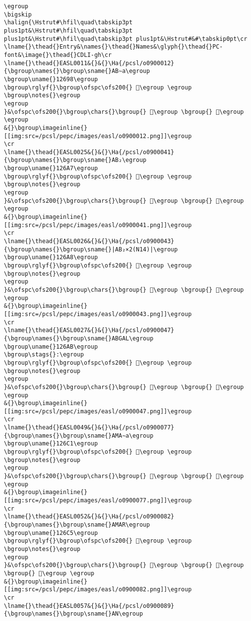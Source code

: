 \begin{verbatim}
\egroup
\bigskip
\halign{\Hstrut#\hfil\quad\tabskip3pt plus1pt&\Hstrut#\hfil\quad\tabskip3pt plus1pt&\Hstrut#\hfil\quad\tabskip3pt plus1pt&\Hstrut#&#\tabskip0pt\cr
\lname{}\thead{}Entry&\names{}\thead{}Names&\glyph{}\thead{}PC-font&\image{}\thead{}CDLI-gh\cr
\lname{}\thead{}EASL0011&{}&{}\Ha{/pcsl/o0900012}{\bgroup\names{}\bgroup\sname{}AB∼a\egroup
\bgroup\uname{}12698\egroup
\bgroup\rglyf{}\bgroup\ofspc\ofs200{} 𒚘\egroup \egroup
\bgroup\notes{}\egroup
\egroup
}&\ofspc\ofs200{}\bgroup\chars{}\bgroup{} 𒚢\egroup \bgroup{} 𒚘\egroup \egroup
&{}\bgroup\imageinline{}[[img:src=/pcsl/pepc/images/easl/o0900012.png]]\egroup
\cr
\lname{}\thead{}EASL0025&{}&{}\Ha{/pcsl/o0900041}{\bgroup\names{}\bgroup\sname{}AB₂\egroup
\bgroup\uname{}126A7\egroup
\bgroup\rglyf{}\bgroup\ofspc\ofs200{} 𒚧\egroup \egroup
\bgroup\notes{}\egroup
\egroup
}&\ofspc\ofs200{}\bgroup\chars{}\bgroup{} 𒚧\egroup \bgroup{} 𒚩\egroup \egroup
&{}\bgroup\imageinline{}[[img:src=/pcsl/pepc/images/easl/o0900041.png]]\egroup
\cr
\lname{}\thead{}EASL0026&{}&{}\Ha{/pcsl/o0900043}{\bgroup\names{}\bgroup\sname{}|AB₂×2(N14)|\egroup
\bgroup\uname{}126A8\egroup
\bgroup\rglyf{}\bgroup\ofspc\ofs200{} 𒚨\egroup \egroup
\bgroup\notes{}\egroup
\egroup
}&\ofspc\ofs200{}\bgroup\chars{}\bgroup{} 𒚪\egroup \bgroup{} 𒚨\egroup \egroup
&{}\bgroup\imageinline{}[[img:src=/pcsl/pepc/images/easl/o0900043.png]]\egroup
\cr
\lname{}\thead{}EASL0027&{}&{}\Ha{/pcsl/o0900047}{\bgroup\names{}\bgroup\sname{}ABGAL\egroup
\bgroup\uname{}126AB\egroup
\bgroup\stags{}:\egroup
\bgroup\rglyf{}\bgroup\ofspc\ofs200{} 𒚫\egroup \egroup
\bgroup\notes{}\egroup
\egroup
}&\ofspc\ofs200{}\bgroup\chars{}\bgroup{} 𒚫\egroup \bgroup{} 𒚬\egroup \egroup
&{}\bgroup\imageinline{}[[img:src=/pcsl/pepc/images/easl/o0900047.png]]\egroup
\cr
\lname{}\thead{}EASL0049&{}&{}\Ha{/pcsl/o0900077}{\bgroup\names{}\bgroup\sname{}AMA∼a\egroup
\bgroup\uname{}126C1\egroup
\bgroup\rglyf{}\bgroup\ofspc\ofs200{} 𒛁\egroup \egroup
\bgroup\notes{}\egroup
\egroup
}&\ofspc\ofs200{}\bgroup\chars{}\bgroup{} 𒛁\egroup \bgroup{} 𒛃\egroup \egroup
&{}\bgroup\imageinline{}[[img:src=/pcsl/pepc/images/easl/o0900077.png]]\egroup
\cr
\lname{}\thead{}EASL0052&{}&{}\Ha{/pcsl/o0900082}{\bgroup\names{}\bgroup\sname{}AMAR\egroup
\bgroup\uname{}126C5\egroup
\bgroup\rglyf{}\bgroup\ofspc\ofs200{} 𒛅\egroup \egroup
\bgroup\notes{}\egroup
\egroup
}&\ofspc\ofs200{}\bgroup\chars{}\bgroup{} 𒛊\egroup \bgroup{} 𒛅\egroup \bgroup{} 𒛉\egroup \egroup
&{}\bgroup\imageinline{}[[img:src=/pcsl/pepc/images/easl/o0900082.png]]\egroup
\cr
\lname{}\thead{}EASL0057&{}&{}\Ha{/pcsl/o0900089}{\bgroup\names{}\bgroup\sname{}AN\egroup

\end{verbatim}
